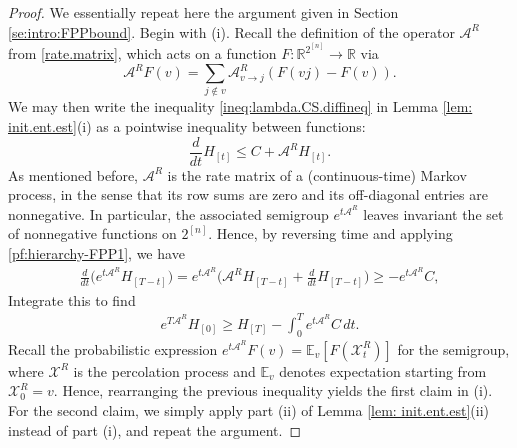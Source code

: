 \documentclass[11pt,reqno]{amsart}
\numberwithin{equation}{section}
\theoremstyle{definition}
\def\CC{{C}}
\def\A{{\mathcal A}}
\def\E{{\mathbb E}}
\def\R{{\mathbb R}}
\def\X{{\mathcal X}}
\begin{document}
\begin{proof}
We essentially repeat here the argument given in Section \ref{se:intro:FPPbound}. Begin with (i). Recall the definition of the operator $\A^{R}$ from \eqref{rate.matrix}, which acts on a function $F:\R^{2^{[n]}} \to \R$ via
\begin{equation}
\A^{R} F(v) =  \sum_{j \notin v} \A^{R}_{v \to j}(F(vj) - F(v)). \label{def:Aoperator}
\end{equation}
We may then write the inequality \eqref{ineq:lambda.CS.diffineq} in Lemma \ref{lem: init.ent.est}(i) as a pointwise inequality between functions:
\begin{equation}
\frac{d}{dt} H_{[t]}   \leq \CC + \A^{R} H_{[t]} . \label{pf:hierarchy-FPP1}
\end{equation}
As mentioned before, $\A^{R}$ is the rate matrix of a (continuous-time) Markov process, in the sense that  its row sums are zero and its off-diagonal entries are nonnegative. In particular, the associated semigroup $e^{t\A^{R}}$ leaves invariant the set of nonnegative functions on $2^{[n]}$. Hence, by reversing time and applying \eqref{pf:hierarchy-FPP1}, we have
\begin{align*}
\frac{d}{dt}\Big( e^{t\A^{R}} H_{[T-t]}\Big) = e^{t\A^{R}} \Big(\A^{R} H_{[T-t]} + \frac{d}{dt}H_{[T-t]}\Big)  \ge - e^{t\A^{R}}\CC,
\end{align*}
Integrate this to find
\begin{align*}
e^{T\A^{R}}H_{[0]} \ge H_{[T]} - \int_0^T e^{t\A^{R}}\CC\,dt.
\end{align*}
Recall the probabilistic expression $e^{t\A^{R}}F(v)=\E_v[F(\X^{R}_t)]$ for the semigroup, where $\X^{R}$ is the percolation process and $\E_v$ denotes expectation starting from $\X^{R}_0=v$. Hence, rearranging the previous inequality yields the first claim in (i). For the second claim, we simply apply part (ii) of Lemma \ref{lem: init.ent.est}(ii) instead of part (i), and repeat the argument. 
	

\end{proof}
\end{document}
